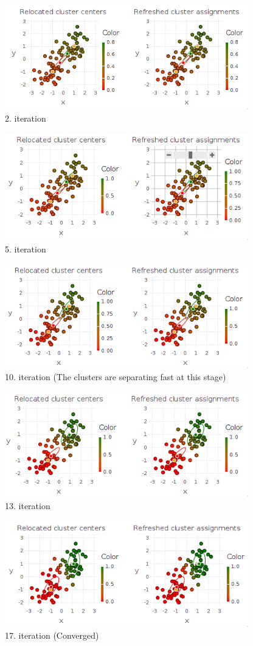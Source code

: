 \documentclass[10pt,a4paper]{article}
\begin{document}
\begin{figure}[ht]
  \centering
  \includegraphics[width=300pt]{8_3_2}
  \caption{2. iteration}
\end{figure}
\begin{figure}[ht]
  \centering
  \includegraphics[width=300pt]{8_3_3}
  \caption{5. iteration}
\end{figure}
\begin{figure}[ht]
  \centering
  \includegraphics[width=300pt]{8_3_4}
  \caption{10. iteration (The clusters are separating fast at this stage)}
\end{figure}
\begin{figure}[ht]
  \centering
  \includegraphics[width=300pt]{8_3_5}
  \caption{13. iteration}
\end{figure}
\begin{figure}[ht]
  \centering
  \includegraphics[width=300pt]{8_3_6}
  \caption{17. iteration (Converged)}
\end{figure}
\end{document}
